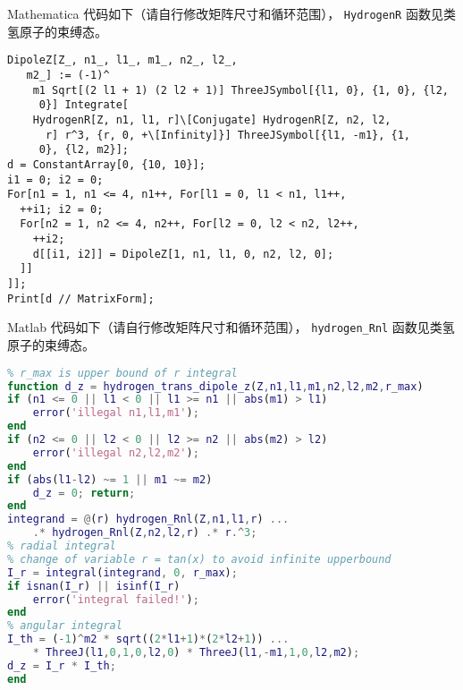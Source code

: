 Mathematica 代码如下（请自行修改矩阵尺寸和循环范围）， \verb|HydrogenR| 函数见类氢原子的束缚态。
\begin{lstlisting}[language=mma,caption=DipoleZ.m]
DipoleZ[Z_, n1_, l1_, m1_, n2_, l2_, 
   m2_] := (-1)^
    m1 Sqrt[(2 l1 + 1) (2 l2 + 1)] ThreeJSymbol[{l1, 0}, {1, 0}, {l2, 
     0}] Integrate[
    HydrogenR[Z, n1, l1, r]\[Conjugate] HydrogenR[Z, n2, l2, 
      r] r^3, {r, 0, +\[Infinity]}] ThreeJSymbol[{l1, -m1}, {1, 
     0}, {l2, m2}];
d = ConstantArray[0, {10, 10}];
i1 = 0; i2 = 0;
For[n1 = 1, n1 <= 4, n1++, For[l1 = 0, l1 < n1, l1++,
  ++i1; i2 = 0;
  For[n2 = 1, n2 <= 4, n2++, For[l2 = 0, l2 < n2, l2++,
    ++i2;
    d[[i1, i2]] = DipoleZ[1, n1, l1, 0, n2, l2, 0];
  ]]
]];
Print[d // MatrixForm];
\end{lstlisting}
Matlab 代码如下（请自行修改矩阵尺寸和循环范围）， \verb`hydrogen_Rnl` 函数见类氢原子的束缚态。
\begin{lstlisting}[language=matlab,caption=hydrogen\_dipole\_z.m]
% hydrogen <n1,l1,m1|z|n2,l2,m2>
% r_max is upper bound of r integral
function d_z = hydrogen_trans_dipole_z(Z,n1,l1,m1,n2,l2,m2,r_max)
if (n1 <= 0 || l1 < 0 || l1 >= n1 || abs(m1) > l1)
    error('illegal n1,l1,m1');
end
if (n2 <= 0 || l2 < 0 || l2 >= n2 || abs(m2) > l2)
    error('illegal n2,l2,m2');
end
if (abs(l1-l2) ~= 1 || m1 ~= m2)
    d_z = 0; return;
end
integrand = @(r) hydrogen_Rnl(Z,n1,l1,r) ...
    .* hydrogen_Rnl(Z,n2,l2,r) .* r.^3;
% radial integral
% change of variable r = tan(x) to avoid infinite upperbound
I_r = integral(integrand, 0, r_max);
if isnan(I_r) || isinf(I_r)
    error('integral failed!');
end
% angular integral
I_th = (-1)^m2 * sqrt((2*l1+1)*(2*l2+1)) ...
    * ThreeJ(l1,0,1,0,l2,0) * ThreeJ(l1,-m1,1,0,l2,m2);
d_z = I_r * I_th;
end
\end{lstlisting}

